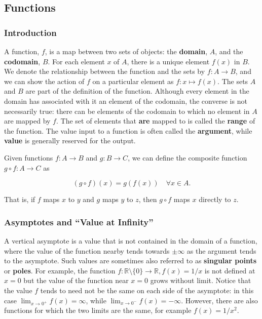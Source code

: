 \documentclass[11pt,titlepage]{article}
\numberwithin{equation}{section}
\begin{document}
\subsection{Functions}
\subsubsection{Introduction}
A function, $f$, is a map between two sets of objects: the \textbf{domain}, $A$, and the \textbf{codomain}, $B$. For each element $x$ of $A$, there is a unique element $f(x)$ in $B$. We denote the relationship between the function and the sets by $f:A\to B$, and we can show the action of $f$ on a particular element as $f:x\mapsto f(x)$. The sets $A$ and $B$ are part of the definition of the function. Although every element in the domain has associated with it an element of the codomain, the converse is not necessarily true: there can be elements of the codomain to which no element in $A$ are mapped by $f$. The set of elements that \textbf{are} mapped to is called the \textbf{range} of the function. The value input to a function is often called the \textbf{argument}, while \textbf{value} is generally reserved for the output.

Given functions $f:A\to B$ and $g:B\to C$, we can define the composite function $g\circ f:A\to C$ as

\begin{equation}
(g\circ f)(x) = g(f(x)) \quad \forall x \in A.
\end{equation}

That is, if $f$ maps $x$ to $y$ and $g$ maps $y$ to $z$, then $g\circ f$ maps $x$ directly to $z$.

\subsubsection{Asymptotes and “Value at Infinity”}
A vertical asymptote is a value that is not contained in the domain of a function, where the value of the function nearby tends towards $\pm\infty$ as the argument tends to the asymptote. Such values are sometimes also referred to as \textbf{singular points} or \textbf{poles}. For example, the function $f:\mathbb{R}\setminus\{0\}\rightarrow\mathbb{R}, f(x)=1/x$ is not defined at $x=0$ but the value of the function near $x=0$ grows without limit. Notice that the value $f$ tends to need not be the same on each side of the asymptote: in this case $\lim_{x\to 0^{+}} f(x) = \infty$, while $\lim_{x\to 0^{-}} f(x) = -\infty$. However, there are also functions for which the two limits are the same, for example $f(x)=1/x^{2}$.
\end{document}
